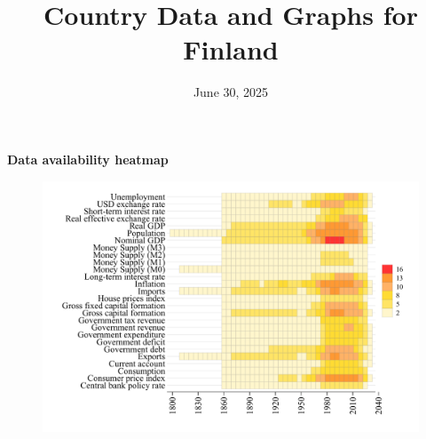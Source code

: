 \documentclass[12pt,a4paper,landscape]{article}
\begin{document}
\title{\Large Country Data and Graphs for Finland}
\date{June 30, 2025}
\maketitle
\thispagestyle{empty}

\clearpage
\setcounter{page}{1}
\hypersetup{colorlinks=true,linkcolor=blue,linktoc=all}
\label{toc}
\tableofcontents
\thispagestyle{empty}
\clearpage
{}
{}
\begin{center}
{\Large\bfseries Data availability heatmap}
\end{center}
\vspace{1cm}
\begin{figure}[H]
\centering
\includegraphics[width=\textwidth,height=0.8\textheight,keepaspectratio]{graphs/FIN_heatmap.pdf}
\end{figure}
\setcounter{page}{3}
\end{document}
